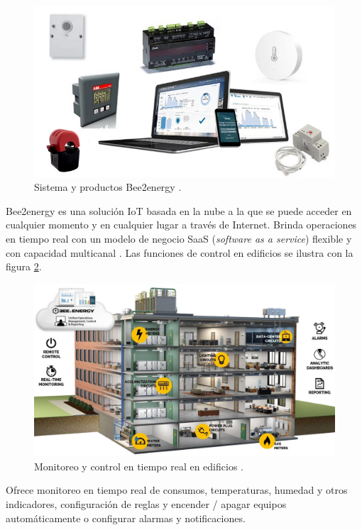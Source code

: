 \begin{itemize}
\begin{figure}[htbp]
	\centering
	\includegraphics[width=.8\textwidth]{./Figures/bee2energy.jpg}
	\caption{Sistema y productos Bee2energy \protect\footnotemark.}
	\label{fig:bee2energy}
\end{figure}


Bee2energy es una solución IoT basada en la nube a la que se puede acceder en cualquier momento y en cualquier lugar a través de Internet. Brinda operaciones en tiempo real con un modelo de negocio SaaS (\emph{\emph{software} as a service}) flexible y con capacidad multicanal \citep{WEBSITE:14}. Las funciones de control en edificios se ilustra con la figura \ref{fig:bee2energy2}.

\begin{figure}[htbp]
	\centering
	\includegraphics[width=.85\textwidth]{./Figures/bee2energy2.jpg}
	\caption{Monitoreo y control en tiempo real en edificios \protect\footnotemark.}
	\label{fig:bee2energy2}
\end{figure}


Ofrece monitoreo en tiempo real de consumos, temperaturas, humedad y otros indicadores, configuración de reglas y encender / apagar equipos automáticamente o configurar alarmas y notificaciones.
\end{itemize}
